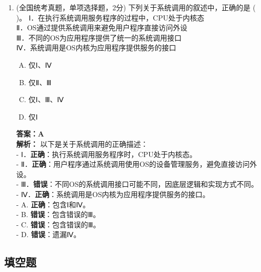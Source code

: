\documentclass[lang=cn,newtx,10pt,scheme=chinese]{../../elegantbook}
\begin{document}
\begin{enumerate}
    \item (全国统考真题，单项选择题，2分) 下列关于系统调用的叙述中，正确的是 (    )。
    Ⅰ．在执行系统调用服务程序的过程中，CPU处于内核态\\
    Ⅱ．OS通过提供系统调用来避免用户程序直接访问外设\\
    Ⅲ．不同的OS为应用程序提供了统一的系统调用接口\\
    Ⅳ．系统调用是OS内核为应用程序提供服务的接口\\
    \begin{enumerate}[A.]
        \item 仅Ⅰ、Ⅳ
        \item 仅Ⅱ、Ⅲ
        \item 仅Ⅰ、Ⅲ、Ⅳ
        \item 仅Ⅰ
    \end{enumerate}
    \textbf{答案：A}\\
    \textbf{解析：} 以下是关于系统调用的正确描述：\\
    - Ⅰ．\textbf{正确}：执行系统调用服务程序时，CPU处于内核态。\\
    - Ⅱ．\textbf{正确}：用户程序通过系统调用使用OS的设备管理服务，避免直接访问外设。\\
    - Ⅲ．\textbf{错误}：不同OS的系统调用接口可能不同，因底层逻辑和实现方式不同。\\
    - Ⅳ．\textbf{正确}：系统调用是OS内核为应用程序提供服务的接口。\\
    - A. \textbf{正确}：包含Ⅰ和Ⅳ。\\
    - B. \textbf{错误}：包含错误的Ⅲ。\\
    - C. \textbf{错误}：包含错误的Ⅲ。\\
    - D. \textbf{错误}：遗漏Ⅳ。\\
\end{enumerate}

\subsection{填空题}
\end{document}
